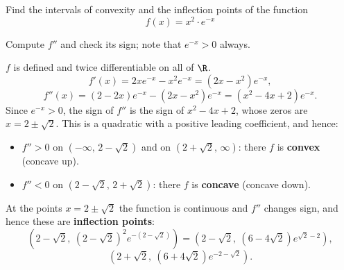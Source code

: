 
\begin{question}
Find the intervals of convexity and the inflection points of the function
\[ f(x)=x^2\cdot e^{-x} \]
\end{question}

\begin{hint}
Compute $f''$ and check its sign; note that $e^{-x}>0$ always.
\end{hint}

\begin{solution}
$f$ is defined and twice differentiable on all of $\R$.
\[ f'(x)=2xe^{-x}-x^2e^{-x}=(2x-x^2)e^{-x}, \]
\[ f''(x)=(2-2x)e^{-x}-(2x-x^2)e^{-x}=(x^2-4x+2)e^{-x}. \]
Since $e^{-x}>0$, the sign of $f''$ is the sign of $x^2-4x+2$, whose zeros are $x=2\pm\sqrt2$. This is a quadratic with a positive leading coefficient, and hence:
\begin{itemize}
  \item $f''>0$ on $(-\infty,\,2-\sqrt2)$ and on $(2+\sqrt2,\,\infty)$: there $f$ is \textbf{convex} (concave up).
  \item $f''<0$ on $(2-\sqrt2,\,2+\sqrt2)$: there $f$ is \textbf{concave} (concave down).
\end{itemize}
At the points $x=2\pm\sqrt2$ the function is continuous and $f''$ changes sign, and hence these are \textbf{inflection points}:
\[ \left(2-\sqrt2,\ (2-\sqrt2)^2e^{-(2-\sqrt2)}\right)=\left(2-\sqrt2,\ (6-4\sqrt2)e^{\sqrt2-2}\right), \]
\[ \left(2+\sqrt2,\ (6+4\sqrt2)e^{-2-\sqrt2}\right). \]
\end{solution}
